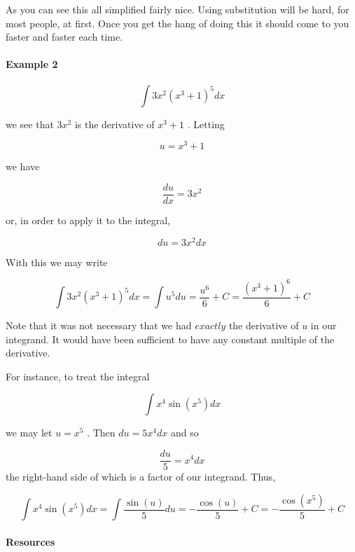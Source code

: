 As you can see this all simplified fairly nice. Using substitution will be hard, for most people, at first. Once you get the hang of doing this it should come to you faster and faster each time.



\paragraph{Example 2}



$$\int 3x^2(x^3+1)^5dx$$



we see that $3x^2$ is the derivative of $x^3+1$ . Letting



$$u=x^3+1$$



we have



$$\frac{du}{dx}=3x^2$$



or, in order to apply it to the integral,



$$du=3x^2dx$$



With this we may write



$$\int 3x^2(x^3+1)^5dx=\int u^5du=\frac{u^6}{6}+C=\frac{(x^3+1)^6}{6}+C$$



Note that it was not necessary that we had $\textit{exactly}$ the derivative of $u$ in our integrand. It would have been sufficient to have any constant multiple of the derivative.



For instance, to treat the integral



$$\int x^4\sin(x^5)dx$$



we may let $u=x^5$ . Then $du=5x^4dx$ and so



$$\frac{du}{5}=x^4dx$$ the right-hand side of which is a factor of our integrand. Thus,



$$\int x^4\sin(x^5)dx=\int\frac{\sin(u)}{5}du=-\frac{\cos(u)}{5}+C=-\frac{\cos(x^5)}{5}+C$$



\paragraph{Resources}



